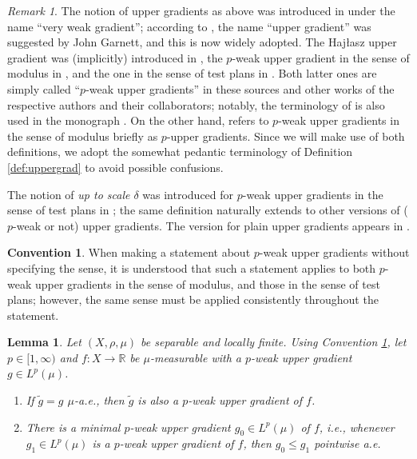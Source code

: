 \documentclass[11pt]{amsart}
\newtheorem{lemma}[theorem]{Lemma}
\theoremstyle{definition}
\newtheorem{convention}[theorem]{Convention}
\theoremstyle{remark}
\newtheorem{remark}[theorem]{Remark}
\numberwithin{equation}{section}
\begin{document}
\begin{remark}
The notion of upper gradients as above was introduced in \cite{HK:96} under the name
``very weak gradient''; according to \cite[p.~55 fn.]{Heinonen:book},
the name ``upper gradient'' was suggested by John Garnett, and this is now widely adopted.
The Haj\l{}asz upper gradient was (implicitly) introduced in \cite{Haj:96},
the $p$-weak upper gradient in the sense of modulus in \cite[(7)]{KM:98}, and the one in the
sense of test plans in \cite[Definition 4.8]{AGS:13}. Both latter ones are simply called
``$p$-weak upper gradients'' in these sources and other works of the respective authors and
their collaborators; notably, the terminology of \cite{KM:98} is also used in the monograph
\cite[page 152]{HKST:book}. On the other hand, \cite{AGS:13} refers to $p$-weak upper
gradients in the sense of modulus briefly as $p$-upper gradients. Since we will make use of
both definitions, we adopt the somewhat pedantic terminology of Definition
\ref{def:uppergrad} to avoid possible confusions.

The notion of {\em up to scale $\delta$} was introduced for $p$-weak upper gradients
in the sense of test plans  in \cite[Definition 26]{ACDM};
the same definition naturally extends to other versions of ($p$-weak or not) upper
gradients.
The version for plain upper gradients appears in \cite[Definition 2.1]{DMS}.
\end{remark}

\begin{convention}\label{con:uppergrad}
When making a statement about $p$-weak upper gradients without specifying the sense, it is
understood that such a statement applies to both $p$-weak upper gradients in the sense of
modulus, and those in the sense of test plans; however, the same sense must be applied
consistently throughout the statement.
\end{convention}

\begin{lemma}\label{lem:minimal-wug}
Let $(X,\rho,\mu)$ be separable and locally finite.
Using Convention \ref{con:uppergrad}, let $p\in[1,\infty)$
and $f:X\to\mathbb R$ be $\mu$-measurable with a $p$-weak upper gradient $g\in L^p(\mu)$.
\begin{enumerate}[\rm(i)]
  \item\label{it:ae-wug} If $\tilde g=g$ $\mu$-a.e., then $\tilde g$ is also a $p$-weak
  upper gradient of $f$.
  \item\label{it:min-wug} There is a minimal $p$-weak upper gradient $g_0\in L^p(\mu)$ of
  $f$, i.e., whenever $g_1\in L^p(\mu)$ is a $p$-weak upper gradient of $f$, then $g_0\leq
  g_1$ pointwise a.e.
\end{enumerate}
\end{lemma}
\end{document}
